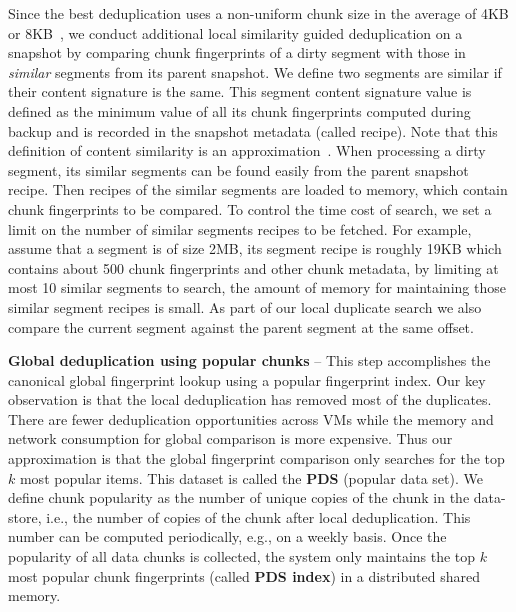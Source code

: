Since the best deduplication uses a non-uniform chunk size 
in the average of 4KB or 8KB~\cite{Jin2009},
we conduct additional local similarity guided deduplication on a snapshot by comparing
chunk fingerprints of a dirty segment 
with those in  {\em similar} segments from its parent snapshot. 
We define two segments are similar if their content signature is the same.
This segment content signature value is defined as the minimum value of all its chunk fingerprints 
computed during backup and is recorded in the snapshot metadata (called recipe). Note that this definition of
content similarity is an approximation~\cite{resemblance97}.  When processing a dirty segment,
its  similar segments can be found easily from the
parent snapshot recipe.  Then recipes of the similar segments are loaded to memory,
which contain chunk fingerprints to be compared.
To control the time cost of search, we set a limit on the number of  similar segments recipes to be fetched. 
For example, assume that  a segment is of size  2MB, 
its segment recipe is roughly 19KB which contains about 500 chunk fingerprints and other chunk metadata,
by limiting at most 10 similar segments to search, the amount of memory for maintaining those 
similar segment recipes is small.
As part of our local duplicate search we also compare the current segment
against the parent segment at the same offset.

\textbf{Global deduplication using popular chunks} --
This step accomplishes the canonical global fingerprint lookup using a popular fingerprint index.
Our key observation is that the local deduplication has removed most of the duplicates.
There are fewer deduplication opportunities across VMs while the memory and network
consumption for global comparison is more expensive.
Thus our approximation is that the global fingerprint comparison only searches for the top $k$
most popular items. This dataset is called the \textbf{PDS} (popular data set). 
We define chunk popularity as the number of unique copies of the chunk in the data-store,
i.e., the number of copies of the chunk after local deduplication.
This number can be computed periodically, e.g., on a weekly basis.
Once the popularity of all data chunks is collected, the system only maintains the top $k$
most popular chunk fingerprints (called \textbf{PDS index}) in a distributed shared memory.  

